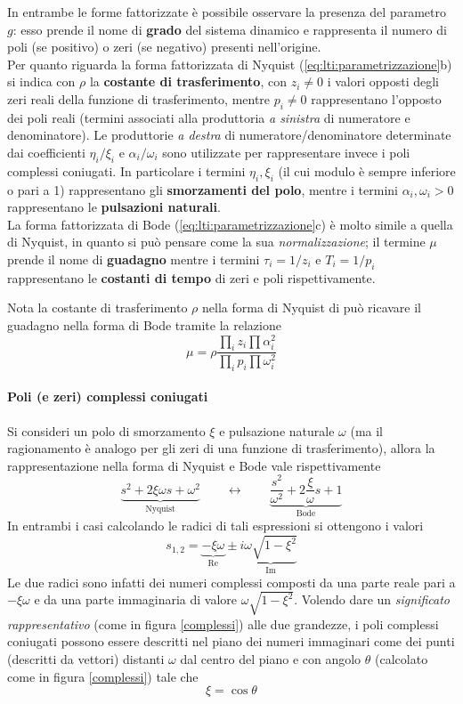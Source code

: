 		In entrambe le forme fattorizzate è possibile osservare la presenza del parametro $g$: esso prende il nome di \textbf{grado} del sistema dinamico e rappresenta il numero di poli (se positivo) o zeri (se negativo) presenti nell'origine. \\
		Per quanto riguarda la forma fattorizzata di Nyquist (\ref{eq:lti:parametrizzazione}b) si indica con  $\rho$ la \textbf{costante di trasferimento}, con $z_i\neq 0$ i valori opposti degli zeri reali della funzione di trasferimento, mentre $p_i \neq 0$ rappresentano l'opposto dei poli reali (termini associati alla produttoria \textit{a sinistra} di numeratore e denominatore). Le produttorie \textit{a destra} di numeratore/denominatore determinate dai coefficienti $\eta_i/\xi_i$ e $\alpha_i/\omega_i$ sono utilizzate per rappresentare invece i poli complessi coniugati. In particolare i termini $\eta_i,\xi_i$ (il cui modulo è sempre inferiore o pari a 1) rappresentano gli \textbf{smorzamenti del polo}, mentre i termini $\alpha_i,\omega_i > 0$ rappresentano le \textbf{pulsazioni naturali}.\\
		La forma fattorizzata di Bode (\ref{eq:lti:parametrizzazione}c) è molto simile a quella di Nyquist, in quanto si può pensare come la sua \textit{ normalizzazione}; il termine $\mu$ prende il nome di \textbf{guadagno} mentre i termini $\tau_i = 1 / z_i$ e $T_i = 1 / p_i$ rappresentano le \textbf{costanti di tempo} di zeri e poli rispettivamente.
		
		Nota la costante di trasferimento $\rho$ nella forma di Nyquist di può ricavare il guadagno nella forma di Bode tramite la relazione
		\[ \mu = \rho \frac{\prod_i z_i \prod\alpha_i^2}{\prod_i p_i \prod\omega_i^2} \] 
		
		\paragraph{Poli (e zeri) complessi coniugati} Si consideri un polo di smorzamento $\xi$ e pulsazione naturale $\omega$ (ma il ragionamento è analogo per gli zeri di una funzione di trasferimento), allora la rappresentazione nella forma di Nyquist e Bode vale rispettivamente
		\[ \underbrace{s^2 + 2 \xi \omega s + \omega^2}_\textrm{Nyquist} \qquad \leftrightarrow \qquad \underbrace{\frac{s^2}{\omega^2} +2 \frac \xi \omega s + 1 }_\textrm{Bode} \]
		 In entrambi i casi calcolando le radici di tali espressioni si ottengono i valori
		 \[ s_{1,2} = \underbrace{- \xi \omega}_\textrm{Re} \pm i\underbrace{ \omega \sqrt{1 - \xi^2}}_\textrm{Im} \]
		 Le due radici sono infatti dei numeri complessi composti da una parte reale pari a $-\xi\omega$ e da una parte immaginaria di valore $\omega \sqrt{1-\xi^2}$. Volendo dare un \textit{significato rappresentativo} (come in figura \ref{complessi}) alle due grandezze, i poli complessi coniugati possono essere descritti nel piano dei numeri immaginari come dei punti (descritti da vettori) distanti $\omega$ dal centro del piano e con angolo $\theta$ (calcolato come in figura \ref{complessi}) tale che
		 \[ \xi = \cos\theta \]
		 
